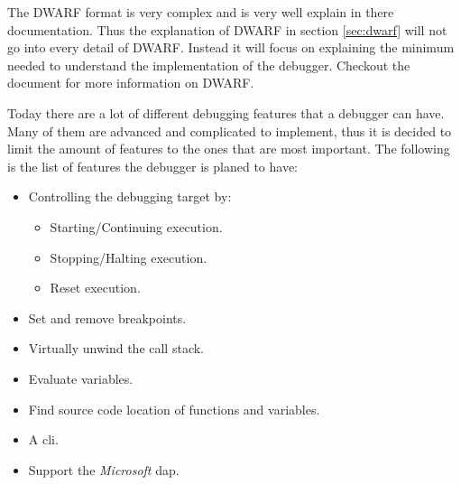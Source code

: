 The \gls{DWARF} format is very complex and is very well explain in there documentation.
Thus the explanation of \gls{DWARF} in section \ref{sec:dwarf} will not go into every detail of \gls{DWARF}.
Instead it will focus on explaining the minimum needed to understand the implementation of the debugger.
Checkout the document \cite{dwarf} for more information on \gls{DWARF}.


Today there are a lot of different debugging features that a debugger can have.
Many of them are advanced and complicated to implement, thus it is decided to limit the amount of features to the ones that are most important.
The following is the list of features the debugger is planed to have:

\begin{itemize}
  \item Controlling the debugging target by:
  \begin{itemize}
    \item Starting/Continuing execution.
    \item Stopping/Halting execution.
    \item Reset execution.
  \end{itemize}
  \item Set and remove breakpoints.
  \item Virtually unwind the call stack.
  \item Evaluate variables.
  \item Find source code location of functions and variables.
  \item A \acrfull{cli}.
  \item Support the \emph{Microsoft} \acrfull{dap}.
\end{itemize}




